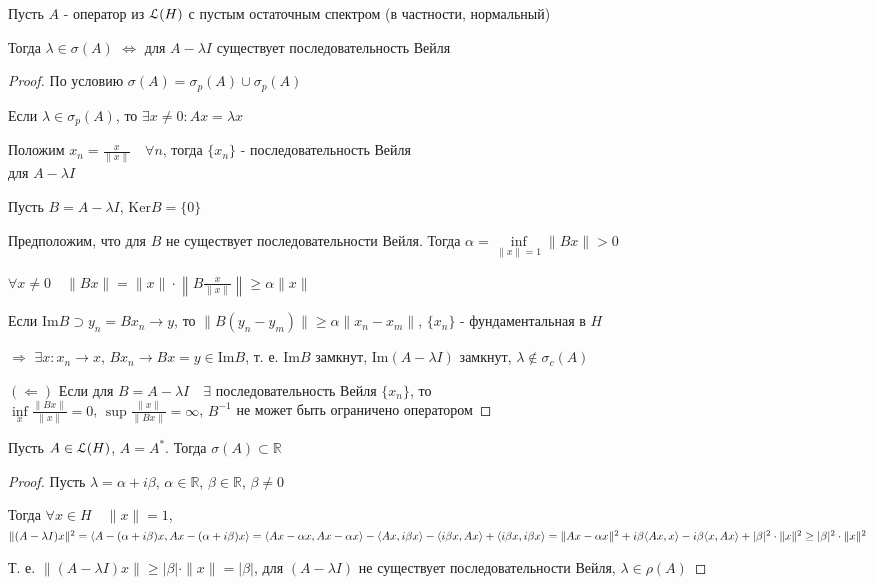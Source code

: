 \documentclass[a4paper,12pt]{report}
\newcommand*{\hm}[1]{#1\nobreak\discretionary{}%
            {\hbox{$\mathsurround=0pt #1$}}{}}
\begin{document}
\begin{thm}
Пусть $A$ - оператор из $\EuScript L(H)$ с пустым остаточным спектром (в частности, нормальный)

Тогда $\lambda\in\sigma(A)$ $\Leftrightarrow$ для $A-\lambda I$ существует последовательность Вейля
\end{thm}
\begin{proof}
По условию $\sigma(A)=\sigma_p(A)\cup\sigma_p(A)$

Если $\lambda\in\sigma_p(A)$, то $\exists x\ne0\colon Ax=\lambda x$

Положим $x_n=\displaystyle\frac{x}{\|x\|}\quad\forall n$, тогда $\{x_n\}$ - последовательность Вейля \\ для $A-\lambda I$

Пусть $B=A-\lambda I$, $\mathrm{Ker}B=\{0\}$

Предположим, что для $B$ не существует последовательности Вейля. Тогда $\alpha=\inf\limits_{\|x\|=1}\|Bx\|>0$

$\forall x\ne0\quad\|Bx\|=\|x\|\cdot\left\|B\displaystyle\frac{x}{\|x\|}\right\|\ge\alpha\|x\|$

Если $\mathrm{Im}B\supset y_n=Bx_n\to y$, то $\|B(y_n-y_m)\|\ge\alpha\|x_n-x_m\|$, $\{x_n\}$ - фундаментальная в $H$

$\Rightarrow$ $\exists x\colon x_n\to x$, $Bx_n\to Bx=y\in\mathrm{Im}B$, т. е. $\mathrm{Im}B$ замкнут, $\mathrm{Im}(A-\lambda I)$ замкнут, $\lambda\notin\sigma_c(A)$

$(\Leftarrow)$ Если для $B=A-\lambda I\quad\exists$ последовательность Вейля $\{x_n\}$, то\\ $\inf\limits_x{\displaystyle\frac{\|Bx\|}{\|x\|}=0}$, $\sup\displaystyle\frac{\|x\|}{\|Bx\|}=\infty$, $B^{-1}$ не может быть ограничено оператором
\end{proof}
 


\begin{thm}
Пусть $A\in\EuScript L(H)$, $A=A^*$. Тогда $\sigma(A)\subset\mathbb R$
\end{thm}
\begin{proof}
Пусть $\lambda=\alpha+i\beta$, $\alpha\in\mathbb R$, $\beta\in\mathbb R$, $\beta\ne0$

Тогда $\forall x\in H\quad\|x\|=1$, $\|(A-\lambda I)x\|^2=\langle A-(\alpha+i\beta)x,Ax-(\alpha+i\beta)x\rangle\hm=\langle Ax-\alpha x,Ax-\alpha x\rangle-\langle Ax,i\beta x\rangle-\langle i\beta x,Ax\rangle+\langle i\beta x,i\beta x\rangle=\|Ax-\alpha x\|^2\hm+i\beta\langle Ax,x\rangle-i\beta\langle x,Ax\rangle+|\beta|^2\cdot\|x\|^2\ge|\beta|^2\cdot\|x\|^2$

Т. е. $\|(A-\lambda I)x\|\ge|\beta|\cdot\|x\|=|\beta|$, для $(A-\lambda I)$ не существует последовательности Вейля, $\lambda\in\rho(A)$
\end{proof}
 
\end{document}
